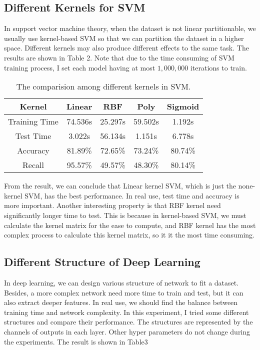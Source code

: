 \documentclass{article}
\begin{document}
\subsection{Different Kernels for SVM}
In support vector machine theory, when the dataset is not linear partitionable, we usually use kernel-based SVM so that we can partition the dataset in a higher space. Different kernels may also produce different effects to the same task. The results are shown in Table 2. Note that due to the time consuming of SVM training process, I set each model having at most $1,000,000$ iterations to train.
\begin{table}[h]
     \centering
     \begin{tabular}{ccccc}
         \hline
         Kernel & Linear & RBF & Poly & Sigmoid \\
         \hline
         Training Time & 74.536s & 25.297s & 59.502s & 1.192s \\
         Test Time & 3.022s & 56.134s & 1.151s & 6.778s \\
         Accuracy & 81.89\% & 72.65\% & 73.24\% & 80.74\% \\
         Recall & 95.57\% & 49.57\% & 48.30\% & 80.14\% \\
         \hline
     \end{tabular}
     \caption{The comparision among different kernels in SVM.}
\end{table}

From the result, we can conclude that Linear kernel SVM, which is just the none-kernel SVM, has the best performance. In real use, test time and accuracy is more important. Another interesting property is that RBF kernel need significantly longer time to test. This is because in kernel-based SVM, we must calculate the kernel matrix for the ease to compute, and RBF kernel has the most complex process to calculate this kernel matrix, so it it the most time consuming.

\subsection{Different Structure of Deep Learning}
In deep learning, we can design various structure of network to fit a dataset. Besides, a more complex network need more time to train and test, but it can also extract deeper features. In real use, we should find the balance between training time and network complexity. In this experiment, I tried some different structures and compare their performance. The structures are represented by the channels of outputs in each layer. Other hyper parameters do not change during the experiments. The result is shown in Table3
\end{document}
